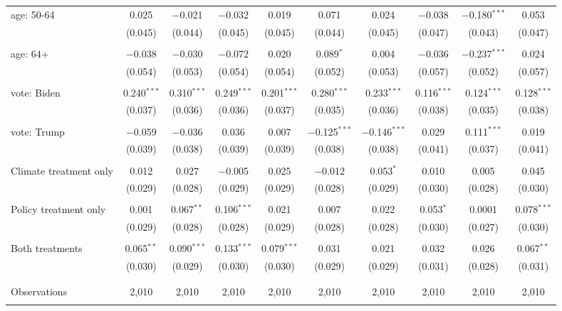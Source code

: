\begin{tabular}{@{\extracolsep{5pt}}lccccccccc}
 age: 50-64 & 0.025 & $-$0.021 & $-$0.032 & 0.019 & 0.071 & 0.024 & $-$0.038 & $-$0.180$^{***}$ & 0.053 \\ 
  & (0.045) & (0.044) & (0.045) & (0.045) & (0.044) & (0.045) & (0.047) & (0.043) & (0.047) \\ 
  & & & & & & & & & \\ 
 age: 64+ & $-$0.038 & $-$0.030 & $-$0.072 & 0.020 & 0.089$^{*}$ & 0.004 & $-$0.036 & $-$0.237$^{***}$ & 0.024 \\ 
  & (0.054) & (0.053) & (0.054) & (0.054) & (0.052) & (0.053) & (0.057) & (0.052) & (0.057) \\ 
  & & & & & & & & & \\ 
 vote: Biden & 0.240$^{***}$ & 0.310$^{***}$ & 0.249$^{***}$ & 0.201$^{***}$ & 0.280$^{***}$ & 0.233$^{***}$ & 0.116$^{***}$ & 0.124$^{***}$ & 0.128$^{***}$ \\ 
  & (0.037) & (0.036) & (0.036) & (0.037) & (0.035) & (0.036) & (0.038) & (0.035) & (0.038) \\ 
  & & & & & & & & & \\ 
 vote: Trump & $-$0.059 & $-$0.036 & 0.036 & 0.007 & $-$0.125$^{***}$ & $-$0.146$^{***}$ & 0.029 & 0.111$^{***}$ & 0.019 \\ 
  & (0.039) & (0.038) & (0.039) & (0.039) & (0.038) & (0.038) & (0.041) & (0.037) & (0.041) \\ 
  & & & & & & & & & \\ 
 Climate treatment only & 0.012 & 0.027 & $-$0.005 & 0.025 & $-$0.012 & 0.053$^{*}$ & 0.010 & 0.005 & 0.045 \\ 
  & (0.029) & (0.028) & (0.029) & (0.029) & (0.028) & (0.029) & (0.030) & (0.028) & (0.030) \\ 
  & & & & & & & & & \\ 
 Policy treatment only & 0.001 & 0.067$^{**}$ & 0.106$^{***}$ & 0.021 & 0.007 & 0.022 & 0.053$^{*}$ & 0.0001 & 0.078$^{***}$ \\ 
  & (0.029) & (0.028) & (0.028) & (0.029) & (0.028) & (0.028) & (0.030) & (0.027) & (0.030) \\ 
  & & & & & & & & & \\ 
 Both treatments & 0.065$^{**}$ & 0.090$^{***}$ & 0.133$^{***}$ & 0.079$^{***}$ & 0.031 & 0.021 & 0.032 & 0.026 & 0.067$^{**}$ \\ 
  & (0.030) & (0.029) & (0.030) & (0.030) & (0.029) & (0.029) & (0.031) & (0.028) & (0.031) \\ 
  & & & & & & & & & \\ 
\hline \\[-1.8ex] 

Observations & 2,010 & 2,010 & 2,010 & 2,010 & 2,010 & 2,010 & 2,010 & 2,010 & 2,010 \\ 
\hline 
\hline \\[-1.8ex] 
\end{tabular} 